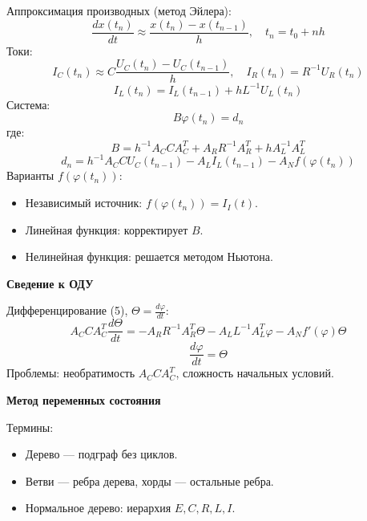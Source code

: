 	Аппроксимация производных (метод Эйлера):
	\begin{equation}
		\frac{d x(t_n)}{dt} \approx \frac{x(t_n) - x(t_{n-1})}{h}, \quad t_n = t_0 + n h
	\end{equation}
	Токи:
	\begin{equation}
		I_C(t_n) \approx C \frac{U_C(t_n) - U_C(t_{n-1})}{h}, \quad I_R(t_n) = R^{-1} U_R(t_n)
	\end{equation}
	\begin{equation}
		I_L(t_n) = I_L(t_{n-1}) + h L^{-1} U_L(t_n)
	\end{equation}
	Система:
	\begin{equation}
		B \varphi(t_n) = d_n
	\end{equation}
	где:
	\begin{equation}
		B = h^{-1} A_C C A_C^T + A_R R^{-1} A_R^T + h A_L^{-1} A_L^T
	\end{equation}
	\begin{equation}
		d_n = h^{-1} A_C C U_C(t_{n-1}) - A_L I_L(t_{n-1}) - A_N f(\varphi(t_n))
	\end{equation}
	Варианты $f(\varphi(t_n))$:
	\begin{itemize}
		\item Независимый источник: $f(\varphi(t_n)) = I_I(t)$.
		\item Линейная функция: корректирует $B$.
		\item Нелинейная функция: решается методом Ньютона.
	\end{itemize}
	
	\textbf{Сведение к ОДУ}
	
	Дифференцирование (5), $\Theta = \frac{d \varphi}{dt}$:
	\begin{equation}
		A_C C A_C^T \frac{d \Theta}{dt} = -A_R R^{-1} A_R^T \Theta - A_L L^{-1} A_L^T \varphi - A_N f'(\varphi) \Theta
	\end{equation}
	\begin{equation}
		\frac{d \varphi}{dt} = \Theta
	\end{equation}
	Проблемы: необратимость $A_C C A_C^T$, сложность начальных условий.
	
	\textbf{Метод переменных состояния}
	
	Термины:
	\begin{itemize}
		\item Дерево — подграф без циклов.
		\item Ветви — ребра дерева, хорды — остальные ребра.
		\item Нормальное дерево: иерархия $E, C, R, L, I$.
	\end{itemize}
	
